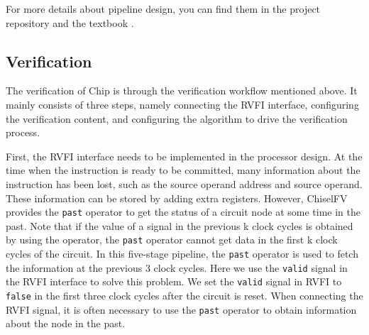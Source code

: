 \documentclass[conference]{IEEEtran}
\theoremstyle{definition}
\begin{document}
For more details about pipeline design, you can find them in the project repository \cite{riscvFvChisel} and the textbook \cite{patterson2017computer}.

\subsection{Verification}
The verification of Chip is through the verification workflow mentioned above.
It mainly consists of three steps, namely connecting the RVFI interface, configuring the verification content, and configuring the algorithm to drive the verification process.

First, the RVFI interface needs to be implemented in the processor design.
At the time when the instruction is ready to be committed, many information about the instruction has been lost, such as the source operand address and source operand.
These information can be stored by adding extra registers.
However, ChiselFV provides the \verb|past| operator to get the status of a circuit node at some time in the past.
Note that if the value of a signal in the previous k clock cycles is obtained by using the operator, the \verb|past| operator cannot get data in the first k clock cycles of the circuit.
In this five-stage pipeline, the \verb|past| operator is used to fetch the information at the previous 3 clock cycles.
Here we use the \verb|valid| signal in the RVFI interface to solve this problem.
We set the \verb|valid| signal in RVFI to \verb|false| in the first three clock cycles after the circuit is reset.
When connecting the RVFI signal, it is often necessary to use the \verb|past| operator to obtain information about the node in the past.
\end{document}
